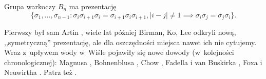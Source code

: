 \begin{comment}
        \strand[semithick] (-3, -2) .. controls (-1, -2) and (-2, 0) .. (0, 0);
        \strand[semithick] (-3, 2) to (0, 2);
        \draw (-6, -3) rectangle (0, 3);
        \draw[semithick, decoration={brace,mirror,raise=3pt},decorate]  (-5.75, -3) -- node[below=6pt] {$\beta_1$} (-0.25, -3);
        \strand[semithick] (+6, 0) .. controls (+4, 0) and (+5, 2) .. (+3, 2);
        \strand[semithick] (+6, 2) .. controls (+4, 2) and (+5, 0) .. (+3, 0);
        \strand[semithick] (+6, -2) to (+3, -2);
        \strand[semithick] (+3, 0) .. controls (+1, 0) and (+2, -2) .. (0, -2);
        \strand[semithick] (+3, -2) .. controls (+1, -2) and (+2, 0) .. (0, 0);
        \strand[semithick] (+3, 2) to (0, 2);
        \draw (+6, -3) rectangle (0, 3);
        \strand[semithick] (6+6, 0) .. controls (6+4, 0) and (6+5, 2) .. (6+3, 2);
        \strand[semithick] (6+6, 2) .. controls (6+4, 2) and (6+5, 0) .. (6+3, 0);
        \strand[semithick] (6+6, -2) to (6+3, -2);
        \strand[semithick] (6+3, 0) .. controls (6+1, 0) and (6+2, -2) .. (6+0, -2);
        \strand[semithick] (6+3, -2) .. controls (6+1, -2) and (6+2, 0) .. (6+0, 0);
        \strand[semithick] (6+3, 2) to (6+0, 2);
        \draw (6+6, -3) rectangle (6+0, 3);
        \draw[semithick, decoration={brace,mirror,raise=3pt},decorate]  (0.25, -3) -- node[below=6pt] {$\beta_2\beta_3$} (11.75, -3);
        \draw[semithick, decoration={brace,raise=3pt},decorate]  (6.25, 3) -- node[above=6pt] {$\beta_3$} (11.75, 3);
        \draw[semithick, decoration={brace,raise=3pt},decorate]  (-5.75, 3) -- node[above=6pt] {$\beta_1\beta_2$} (5.75, 3);
    \end{knot}
    \end{tikzpicture}
\]
\end{comment}

\begin{proposition}
    Grupa warkoczy $B_n$ ma prezentację
    \begin{equation}
        \{\sigma_1, \ldots, \sigma_{n-1} : \sigma_i\sigma_{i+1} \sigma_i = \sigma_{i+1} \sigma_i \sigma_{i+1}, |i-j| \neq 1 \implies \sigma_i \sigma_j = \sigma_j \sigma_i\}.
    \end{equation}
\end{proposition}

Pierwszy był sam Artin \cite{artin25}, wiele lat później Birman, Ko, Lee odkryli nową, ,,symetryczną'' prezentację, ale dla oszczędności miejsca nawet ich nie cytujemy.
%
%
%
%
Wraz z~upływem wody w~Wiśle pojawiły się nowe dowody (w~kolejności chronologicznej): Magnusa \cite{magnus34}, Bohnenblusa \cite{bohnenblust47}, Chow \cite{chow48}, Fadella i van Buskirka \cite{fadell62}, Foxa i Neuwirtha \cite{fox62}.
%
%
%
%
%
%
%
Patrz też \cite{birman74}.

